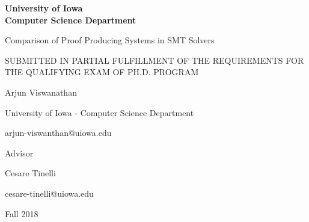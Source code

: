 \documentclass{report}
\begin{document}
\begin{titlepage}
	\centering
	{\textbf{\Large University of Iowa \\ Computer Science Department}}
	\vspace{1cm}
	
	{\Huge Comparison of Proof Producing Systems in SMT Solvers \par}
	\vspace{1cm}
	
	{\large SUBMITTED IN PARTIAL FULFILLMENT OF THE REQUIREMENTS 
		FOR THE QUALIFYING EXAM OF PH.D. PROGRAM \par}
	\vspace{2cm}
	
	{\Large Arjun Viswanathan \par}
	{\large University of Iowa - Computer Science Department \par}
	{\large arjun-viswanthan@uiowa.edu}
	\vspace{2cm}
	
	{\large Advisor \par}
	{\Large Cesare Tinelli \par}
	{\large cesare-tinelli@uiowa.edu \par}
	
	\vfill
	{\large Fall 2018}
\end{titlepage}

\begin{abstract}
Satisfiability Modulo Theories (SMT) solvers input typically
large formulas that contain both Boolean logic and logic in 
different theories - such as arithmetic and strings - and 
decide whether 
the formulas are satisfiable or unsatisfiable. Verification 
tools use these solvers to prove system properties. As a 
result, solver output must be trustable. However, SMT solvers 
are really complicated tools that have tens of thousands of lines of code. One way to make SMT solver ouput more reliable is 
to have them produce proofs of their results. 
For satisfied formulas, this can be a model of 
satisfaction, that is, values for all the variables in the
formula. For unsatisfied formulas, it is a transformation of 
the formula into a simple contradiction using a small set of 
inference rules, checkable by an external tool such as a proof 
checker. This report describes the proof producing mechanisms 
commonly used SMT solvers and compares the proof systems 
of CVC4, VeriT, and Z3, three state-of-the-art SMT solvers.
\end{abstract}
\end{document}
